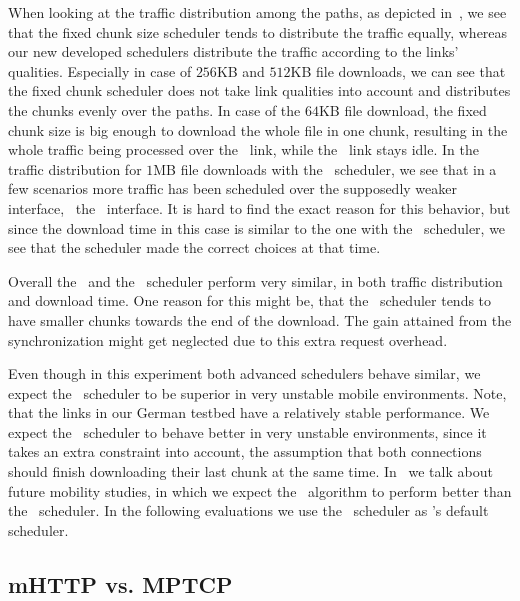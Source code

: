 When looking at the traffic distribution among the paths, as depicted in~, we see that the fixed chunk size scheduler tends to distribute the traffic equally, whereas our new developed schedulers distribute the traffic according to the links' qualities. 
Especially in case of $256$KB and $512$KB file downloads, we can see that the fixed chunk scheduler does not take link qualities into account and distributes the chunks evenly over the paths. 
In case of the $64$KB file download, the fixed chunk size is big enough to download the whole file in one chunk, resulting in the whole traffic being processed over the \ethernet~link, while the \wifi~link stays idle. 
In the traffic distribution for $1$MB file downloads with the \algslice~scheduler, we see that in a few scenarios more traffic has been scheduled over the supposedly weaker interface, \ie~the \wifi~interface. 
It is hard to find the exact reason for this behavior, but since the download time in this case is similar to the one with the \algalpha~scheduler, we see that the scheduler made the correct choices at that time. 

Overall the \algalpha~and the \algslice~scheduler perform very similar, in both traffic distribution and download time. 
One reason for this might be, that the \algslice~scheduler tends to have smaller chunks towards the end of the download. 
The gain attained from the synchronization might get neglected due to this extra request overhead. 

Even though in this experiment both advanced schedulers behave similar, we expect the \algslice~scheduler to be superior in very unstable mobile environments. 
Note, that the links in our German testbed have a relatively stable performance. 
We expect the \algslice~scheduler to behave better in very unstable environments, since it takes an extra constraint into account, \ie the assumption that both connections should finish downloading their last chunk at the same time.
In~ we talk about future mobility studies, in which we expect the \algslice~algorithm to perform better than the \algalpha~scheduler. 
In the following evaluations we use the \algslice~scheduler as \mhttp's default scheduler. 

\subsection{mHTTP vs. MPTCP}
\label{sec:evaluation-mptcp}

